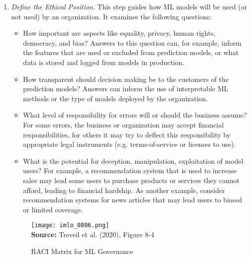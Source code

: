\begin{enumerate}
\item \emph{Define the Ethical Position}. This step guides how ML models will be used (or not used) by an organization. It examines the following questions:
\begin{itemize}
  \item How important are aspects like equality, privacy, human rights, democracy, and bias? Answers to this question can, for example, inform the features that are used or excluded from prediction models, or what data is stored and logged from models in production. 
  \item How transparent should decision making be to the customers of the prediction models? Answers can inform the use of interpretable ML methods or the type of models deployed by the organization. 
  \item What level of responsibility for errors will or should the business assume? For some errors, the business or organization may accept financial responsibilities, for others it may try to deflect this responsibility by appropriate legal instruments (e.g. terms-of-service or licenses to use). 
  \item What is the potential for deception, manipulation, exploitation of model users? For example, a recommendation system that is used to increase sales may lead some users to purchase products or services they cannot afford, leading to financial hardship. As another example, consider recommendation systems for news articles that may lead users to biased or limited coverage. 
\end{itemize}

\begin{figure}
\centering
\texttt{[image: imlo\_0806.png]} \\

\scriptsize \textbf{Source:} Treveil et al. (2020), Figure 8-4
\caption{RACI Matrix for ML Governance}
\label{fig:mlraci}
\end{figure}


\end{enumerate}
